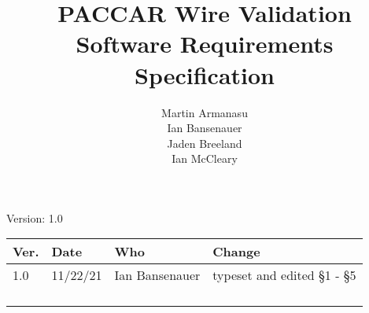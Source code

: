\documentclass[letterpaper,12pt]{article}
\title{PACCAR Wire Validation\\Software Requirements Specification}
\author{Martin Armanasu\\Ian Bansenauer\\Jaden Breeland\\Ian McCleary}
\begin{document}
\maketitle

\begin{center}
  Version: 1.0
\end{center}

\vfill
\begin{tabularx}{\textwidth}{|l|l|l|X|}\hline
Ver. & Date & Who & Change \\\hline
 1.0 & 11/22/21   & Ian Bansenauer & typeset and edited \S 1 - \S5 \\\hline
     &      &     &        \\\hline
     &      &     &        \\\hline
     &      &     &        \\\hline
     &      &     &        \\\hline
\end{tabularx}

\newpage







\appendix 



\end{document}
